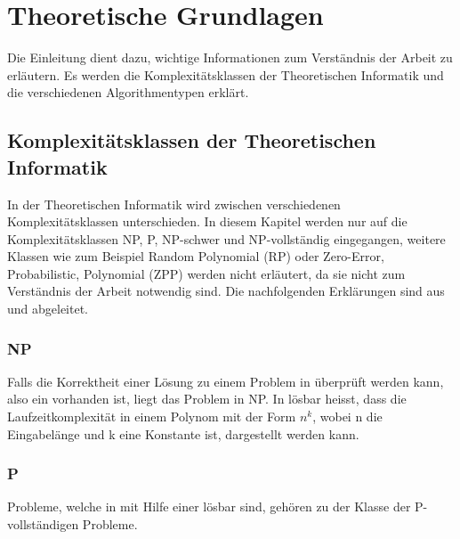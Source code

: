%
%

\chapter{Theoretische Grundlagen}\label{chap.einleitung}
Die Einleitung dient dazu, wichtige Informationen zum Verständnis der Arbeit zu erläutern. Es werden die Komplexitätsklassen der Theoretischen Informatik und die verschiedenen 
Algorithmentypen erklärt.

\section{Komplexitätsklassen der Theoretischen Informatik}\label{cat_theo_inf}
In der Theoretischen Informatik wird zwischen verschiedenen Komplexitätsklassen unterschieden. In diesem Kapitel werden nur auf die Komplexitätsklassen NP, P, NP-schwer und 
NP-vollständig eingegangen, weitere Klassen wie zum Beispiel Random Polynomial (RP) oder Zero-Error, Probabilistic, Polynomial (ZPP) werden nicht erläutert, da sie nicht zum Verständnis der 
Arbeit notwendig sind. Die nachfolgenden Erklärungen sind aus \cite{hopcroft2011einfuehrung} und \cite{slides_p_np} abgeleitet.

\subsection{NP}\label{np}
Falls die Korrektheit einer Lösung zu einem Problem in  überprüft werden kann, also ein  vorhanden ist, liegt das Problem in 
NP.  In  lösbar heisst, dass die Laufzeitkomplexität in einem Polynom mit der Form $n^k$, wobei n die Eingabelänge und k eine Konstante ist, dargestellt werden 
kann.

\subsection{P}\label{p_complet}
Probleme, welche in  mit Hilfe einer  lösbar sind, gehören zu der Klasse der P-vollständigen Probleme.

